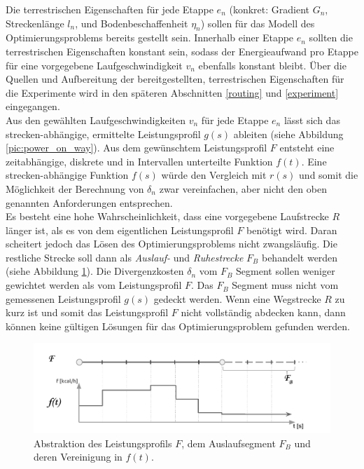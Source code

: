 \documentclass[12pt]{article}
\begin{document}
Die terrestrischen Eigenschaften für jede Etappe $e_{n}$ (konkret: Gradient $G_{n}$, Streckenlänge $l_{n}$, und Bodenbeschaffenheit $\eta_{n}$) sollen für das Modell des Optimierungsproblems bereits gestellt sein. Innerhalb einer Etappe $e_{n}$ sollten die terrestrischen Eigenschaften konstant sein, sodass der Energieaufwand pro Etappe für eine vorgegebene Laufgeschwindigkeit $v_{n}$ ebenfalls konstant bleibt. Über die Quellen und Aufbereitung der bereitgestellten, terrestrischen Eigenschaften für die Experimente wird in den späteren Abschnitten \ref{routing} und \ref{experiment} eingegangen.\\
Aus den gewählten Laufgeschwindigkeiten $v_{n}$ für jede Etappe $e_{n}$ lässt sich das strecken-abhängige, ermittelte Leistungsprofil $g(s)$ ableiten (siehe Abbildung \ref{pic:power_on_way}). Aus dem gewünschtem Leistungsprofil $F$ entsteht eine zeitabhängige, diskrete und in Intervallen unterteilte Funktion $f(t)$. Eine strecken-abhängige Funktion $f(s)$ würde den Vergleich mit $r(s)$ und somit die Möglichkeit der Berechnung von $\delta_{n}$ zwar vereinfachen, aber nicht den oben genannten Anforderungen entsprechen.\\
Es besteht eine hohe Wahrscheinlichkeit, dass eine vorgegebene Laufstrecke $R$ länger ist, als es von dem eigentlichen Leistungsprofil $F$ benötigt wird. Daran scheitert jedoch das Lösen des Optimierungsproblems nicht zwangsläufig. Die restliche Strecke soll dann als \textit{Auslauf-} und \textit{Ruhestrecke} $F_{B}$ behandelt werden (siehe Abbildung \ref{pic:power_on_time}). Die Divergenzkosten $\delta_{n}$ vom $F_{B}$ Segment sollen weniger gewichtet werden als vom Leistungsprofil $F$. Das $F_B$ Segment muss nicht vom gemessenen Leistungsprofil $g(s)$ gedeckt werden. Wenn eine Wegstrecke $R$ zu kurz ist und somit das Leistungsprofil $F$ nicht vollständig abdecken kann, dann können keine gültigen Lösungen für das Optimierungsproblem gefunden werden.

\begin{figure}[ht]
	\begin{center}
	\includegraphics[width=\textwidth]{pics/pdf/002_Power_on_Time.pdf}
	\caption{Abstraktion des Leistungsprofils $F$, dem Auslaufsegment $F_{B}$ und deren Vereinigung in $f(t)$.}
	\label{pic:power_on_time}
	\end{center}
\end{figure}
\end{document}
